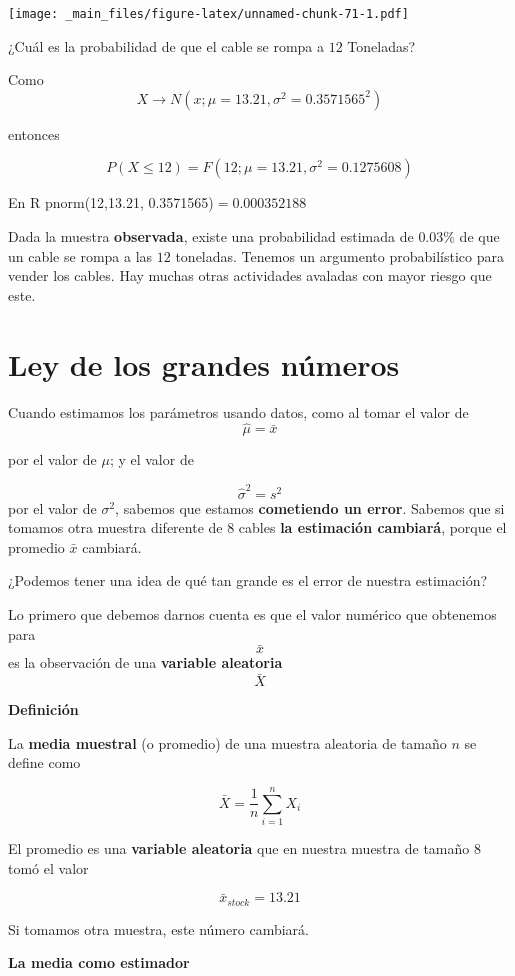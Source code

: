 \documentclass[
]{book}
\begin{document}
\texttt{[image: \_main\_files/figure-latex/unnamed-chunk-71-1.pdf]}

¿Cuál es la probabilidad de que el cable se rompa a \(12\) Toneladas?

Como \[X \rightarrow N(x; \mu=13.21, \sigma^2=0.3571565^2)\]

entonces

\[P(X \leq 12)= F(12; \mu=13.21, \sigma^2=0.1275608)\]

En R pnorm(12,13.21, 0.3571565)\(=0.000352188\)

Dada la muestra \textbf{observada}, existe una probabilidad estimada de \(0.03\%\) de que un cable se rompa a las \(12\) toneladas. Tenemos un argumento probabilístico para vender los cables. Hay muchas otras actividades avaladas con mayor riesgo que este.

\hypertarget{ley-de-los-grandes-nuxfameros}{%
\section{Ley de los grandes números}\label{ley-de-los-grandes-nuxfameros}}

Cuando estimamos los parámetros usando datos, como al tomar el valor de \[\hat{\mu}=\bar{x}\]

por el valor de \(\mu\); y el valor de

\[\hat{\sigma}^2=s^2\]
por el valor de \(\sigma^2\), sabemos que estamos \textbf{cometiendo un error}. Sabemos que si tomamos otra muestra diferente de \(8\) cables \textbf{la estimación cambiará}, porque el promedio \(\bar{x}\) cambiará.

¿Podemos tener una idea de qué tan grande es el error de nuestra estimación?

Lo primero que debemos darnos cuenta es que el valor numérico que obtenemos para \[\bar{x}\] es la observación de una \textbf{variable aleatoria} \[\bar{X}\]

\textbf{Definición}

La \textbf{media muestral} (o promedio) de una muestra aleatoria de tamaño \(n\) se define como

\[\bar{X}=\frac{1}{n}\sum_{i=1}^n X_i\]

El promedio es una \textbf{variable aleatoria} que en nuestra muestra de tamaño \(8\) tomó el valor

\[\bar{x}_{stock}=13.21\]

Si tomamos otra muestra, este número cambiará.

\textbf{La media como estimador}
\end{document}
